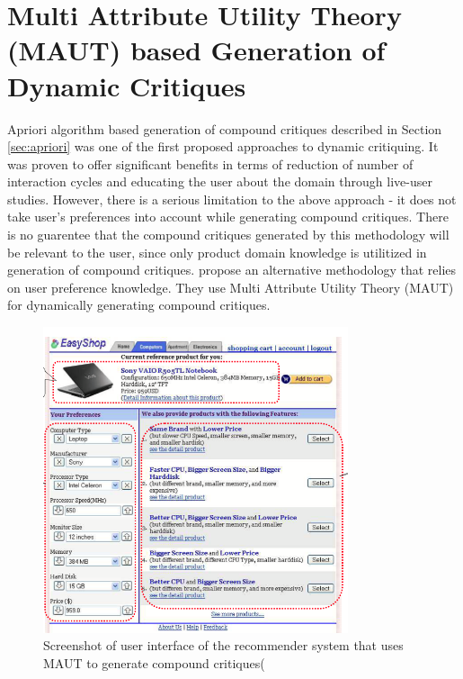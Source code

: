 \section{Multi Attribute Utility Theory (MAUT) based Generation of Dynamic Critiques}
\label{sec:maut}
Apriori algorithm based generation of compound critiques described in Section \ref{sec:apriori} was one of the first proposed approaches to dynamic critiquing.
It was proven to offer significant benefits in terms of reduction of number of interaction cycles and educating the user about the domain through live-user studies.
However, there is a serious limitation to the above approach - it does not take user's preferences into account while generating compound critiques.
There is no guarentee that the compound critiques generated by this methodology will be relevant to the user, since only product domain knowledge is utilitized in generation of compound critiques.
\cite{mautPaper} propose an alternative methodology that relies on user preference knowledge.
They use Multi Attribute Utility Theory (MAUT) for dynamically generating compound critiques.
\begin{figure}
  \centering
    \includegraphics[width=0.8\textwidth]{figures-bharath/maut.png}
  \caption{Screenshot of user interface of the recommender system that uses MAUT to generate compound critiques(\cite{mautPaper}}
\label{fig:maut}
\end{figure}

